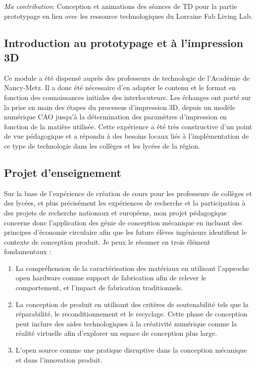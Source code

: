 \documentclass[
  11pt,
]{article}
\providecommand{\tightlist}{%
  \setlength{\itemsep}{0pt}\setlength{\parskip}{0pt}}\usepackage{longtable,booktabs,array}
\begin{document}
\emph{Ma contribution}: Conception et animations des séances de TD pour
la partie prototypage en lien avec les ressource technologiques du
Lorraine Fab Living Lab.

\hypertarget{introduction-au-prototypage-et-uxe0-limpression-3d}{%
\subsection{Introduction au prototypage et à l'impression
3D}\label{introduction-au-prototypage-et-uxe0-limpression-3d}}

Ce module a été dispensé auprès des professeurs de technologie de
l'Académie de Nancy-Metz. Il a donc été nécessaire d'en adapter le
contenu et le format en fonction des connaissances initiales des
interlocuteurs. Les échanges ont porté sur la prise en main des étapes
du processus d'impression 3D, depuis un modèle numérique CAO jusqu'à la
détermination des paramètres d'impression en fonction de la matière
utilisée. Cette expérience a été très constructive d'un point de vue
pédagogique et a répondu à des besoins locaux liés à l'implémentation de
ce type de technologie dans les collèges et les lycées de la région.

\hypertarget{projet-denseignement}{%
\subsection{Projet d'enseignement}\label{projet-denseignement}}

Sur la base de l'expérience de création de cours pour les professeurs de
collèges et des lycées, et plus précisément les expériences de recherche
et la participation à des projets de recherche nationaux et européens,
mon projet pédagogique concerne donc l'application des génie de
conception mécanique en incluant des principes d'économie circulaire
afin que les future élèves ingénieurs identifient le contexte de
conception produit. Je peux le résumer en trois élément fondamentaux :

\begin{enumerate}
\def\labelenumi{\arabic{enumi}.}
\tightlist
\item
  La compréhension de la caractérisation des matériaux en utilisant
  l'approche open hardware comme support de fabrication afin de relever
  le comportement, et l'impact de fabrication traditionnels.
\item
  La conception de produit en utilisant des critères de soutenabilité
  tels que la réparabilité, le reconditionnement et le recyclage. Cette
  phase de conception peut inclure des aides technologiques à la
  créativité numérique comme la réalité virtuelle afin d'explorer un
  espace de conception plus large.
\item
  L'open source comme une pratique disruptive dans la conception
  mécanique et dans l'innovation produit.
\end{enumerate}
\end{document}
